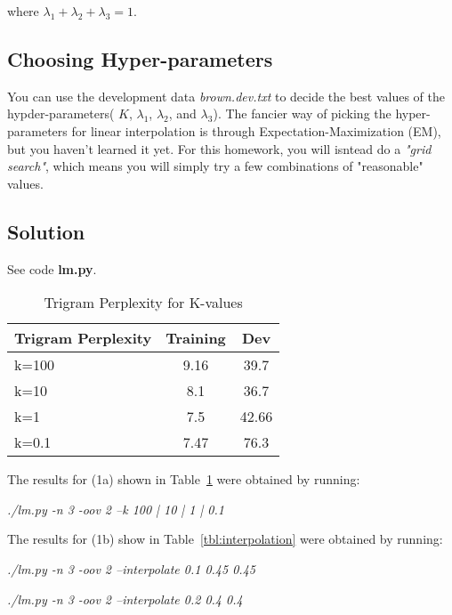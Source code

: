 \documentclass[11pt]{article}
\begin{document}
where $\lambda_1 + \lambda_2 + \lambda_3 = 1$.

\subsection*{Choosing Hyper-parameters}

You can use the development data \textit{brown.dev.txt} to decide the best values of the hypder-parameters( $K$, $\lambda_1$, $\lambda_2$, and $\lambda_3$). The fancier way of picking the hyper-parameters for linear interpolation is through Expectation-Maximization (EM), but you haven't learned it yet. For this homework, you will isntead do a \textit{"grid search"}, which means you will simply try a few combinations of "reasonable" values.

\subsection*{Solution}

See code \textbf{lm.py}. 

\bigskip

\begin{table}
	\begin{center}
		\begin{tabular}{l|c|c|}
		\textbf{Trigram Perplexity} & \textbf{Training} & \textbf{Dev} \\
		\hline
		k=100 & 9.16 & 39.7  \\
		k=10 & 8.1 & 36.7  \\
		k=1 & 7.5 & 42.66  \\
		k=0.1 & 7.47 & 76.3\\
		\end{tabular}
		\caption{Trigram Perplexity for K-values}
		\label{tbl:trigramk}
	\end{center}
\end{table}

The results for (1a) shown in Table~\ref{tbl:trigramk} were obtained by running:

\bigskip

 \textit{./lm.py -n 3 -oov 2 --k 100 | 10 | 1 | 0.1}

\bigskip

The results for (1b) show in Table~\ref{tbl:interpolation} were obtained by running:

\bigskip

\textit{./lm.py -n 3 -oov 2 --interpolate 0.1 0.45 0.45}

\textit{./lm.py -n 3 -oov 2 --interpolate 0.2 0.4 0.4}
\end{document}
